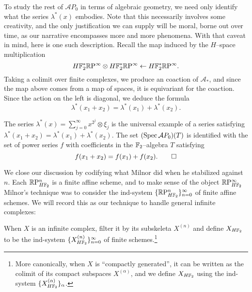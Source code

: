 
To study the rest of $\mathcal AP_0$ in terms of algebraic geometry, we need only identify what the series $\lambda^*(x)$ embodies.  Note that this necessarily involves some creativity, and the only justification we can supply will be moral, borne out over time, as our narrative encompasses more and more phenomena.  With that caveat in mind, here is one such description.  Recall the map induced by the $H$--space multiplication \[H\mathbb F_2^* \mathbb R\mathrm P^\infty \otimes H\mathbb F_2^* \mathbb R\mathrm P^\infty \leftarrow H\mathbb F_2^* \mathbb R\mathrm P^\infty.\]  Taking a colimit over finite complexes, we produce an coaction of $\mathcal A_*$, and since the map above comes from a map of spaces, it is equivariant for the coaction.  Since the action on the left is diagonal, we deduce the formula \[\lambda^*(x_1 + x_2) = \lambda^*(x_1) + \lambda^*(x_2).\]

\begin{lemma}
The series $\lambda^*(x) = \sum_{j=0}^\infty x^{2^j} \otimes \xi_j$ is the universal example of a series satisfying $\lambda^*(x_1 + x_2) = \lambda^*(x_1) + \lambda^*(x_2)$.  The set $(\operatorname{Spec} \mathcal AP_0)(T)$ is identified with the set of power series $f$ with coefficients in the $\mathbb F_2$--algebra $T$ satisfying \[f(x_1 + x_2) = f(x_1) + f(x_2). \qed\]
\end{lemma}

We close our discussion by codifying what Milnor did when he stabilized against $n$.  Each $\mathbb R\mathrm P^n_{H\mathbb F_2}$ is a finite affine scheme, and to make sense of the object $\mathbb R\mathrm P^\infty_{H\mathbb F_2}$ Milnor's technique was to consider the ind-system $\{\mathbb R\mathrm P^n_{H\mathbb F_2}\}_{n=0}^\infty$ of finite affine schemes.  We will record this as our technique to handle general infinite complexes:
\begin{definition}
When $X$ is an infinite complex, filter it by its subskeleta $X^{(n)}$ and define $X_{H\mathbb F_2}$ to be the ind-system $\{X^{(n)}_{H\mathbb F_2}\}_{n=0}^\infty$ of finite schemes.\footnote{More canonically, when $X$ is ``compactly generated'', it can be written as the colimit of its compact subspaces $X^{(\alpha)}$, and we define $X_{H\mathbb F_2}$ using the ind-system $\{X^{(\alpha)}_{H\mathbb F_2}\}_\alpha$.}
\end{definition}

